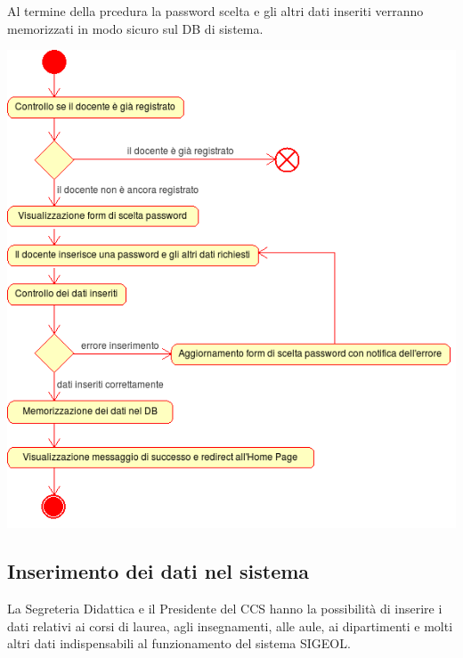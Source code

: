 \documentclass[11pt,a4paper]{article}
\begin{document}
Al termine della prcedura la password scelta e gli altri dati inseriti verranno memorizzati in modo sicuro sul DB di sistema.
\begin{center}
 \includegraphics[scale=0.8]{images/registrazione_docente.png}
\end{center}

\newpage
\subsection{Inserimento dei dati nel sistema}
La Segreteria Didattica e il Presidente del CCS hanno la possibilità di inserire i dati relativi ai corsi di laurea, agli insegnamenti, alle aule, ai dipartimenti e molti altri dati indispensabili al funzionamento del sistema SIGEOL.
\end{document}
